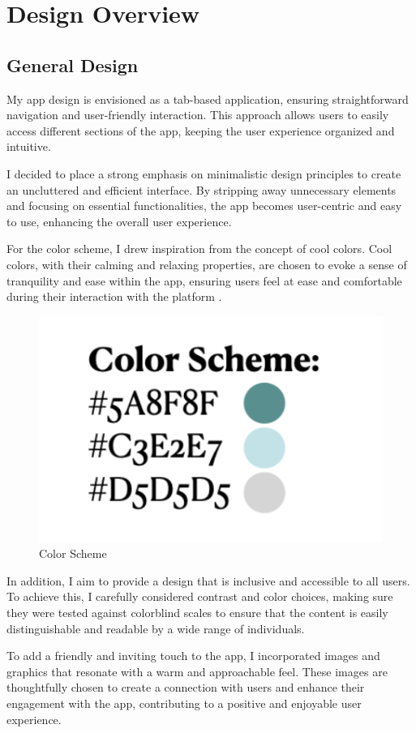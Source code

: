 \chapter{Design Overview}

\section{General Design}

My app design is envisioned as a tab-based application, ensuring straightforward navigation and user-friendly interaction. This approach allows users to easily access different sections of the app, keeping the user experience organized and intuitive.

I decided to place a strong emphasis on minimalistic design principles to create an uncluttered and efficient interface. By stripping away unnecessary elements and focusing on essential functionalities, the app becomes user-centric and easy to use, enhancing the overall user experience.

For the color scheme, I drew inspiration from the concept of cool colors. Cool colors, with their calming and relaxing properties, are chosen to evoke a sense of tranquility and ease within the app, ensuring users feel at ease and comfortable during their interaction with the platform \cite{Bilucaglia}.

\begin{figure}[H]
    \centering
    \includegraphics[width=0.2\linewidth]{thesis//chapters//images/colorScheme.png}
    \caption{Color Scheme}
    \label{fig:color-scheme}
\end{figure}

In addition, I aim to provide a design that is inclusive and accessible to all users. To achieve this, I carefully considered contrast and color choices, making sure they were tested against colorblind scales to ensure that the content is easily distinguishable and readable by a wide range of individuals.

To add a friendly and inviting touch to the app, I incorporated images and graphics that resonate with a warm and approachable feel. These images are thoughtfully chosen to create a connection with users and enhance their engagement with the app, contributing to a positive and enjoyable user experience.

